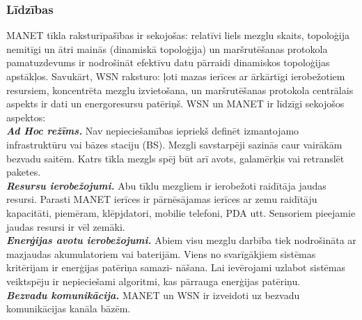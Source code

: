 \subsubsection{Līdzības}
MANET tīkla raksturīpašības ir sekojošas: relatīvi liels mezglu skaits, topoloģija nemitīgi un ātri mainās (dinamiskā topoloģija) un maršrutēšanas protokola pamatuzdevums ir nodrošināt efektīvu datu pārraidi dinamiskos topoloģijas apstākļos. Savukārt, WSN raksturo: ļoti mazas ierīces ar ārkārtīgi ierobežotiem resursiem, koncentrēta mezglu izvietošana, un maršrutēšanas protokola centrālais aspekts ir dati un energoresursu patēriņš. WSN un MANET ir līdzīgi sekojošos aspektos:\\
\small\textbf{\textit{Ad Hoc režīms.}} Nav nepieciešamības iepriekš definēt izmantojamo infrastruktūru vai bāzes staciju (BS). Mezgli savstarpēji sazinās caur vairākām bezvadu saitēm. Katrs tīkla mezgls spēj būt arī avots, galamērķis vai retranslēt paketes.  \\
\small\textbf{\textit{Resursu ierobežojumi.}} Abu tīklu mezgliem ir ierobežoti raidītāja jaudas resursi. Parasti MANET ierīces ir pārnēsājamas ierīces ar zemu raidītāju kapacitāti, piemēram, klēpjdatori, mobilie telefoni, PDA utt.  Sensoriem pieejamie jaudas resursi ir vēl zemāki. \\
\small\textbf{\textit{Enerģijas avotu ierobežojumi.}} Abiem visu mezglu darbība tiek nodrošināta ar mazjaudas akumulatoriem vai baterijām. Viens no svarīgākjiem sistēmas kritērijam ir enerģijas patēriņa samazi- nāšana. Lai ievērojami uzlabot sistēmas veiktspēju ir nepieciešami algoritmi, kas pārrauga enerģijas patēriņu.\\
\small\textbf{\textit{Bezvadu komunikācija.}} MANET un WSN ir izveidoti uz bezvadu komunikācijas kanāla bāzēm.

